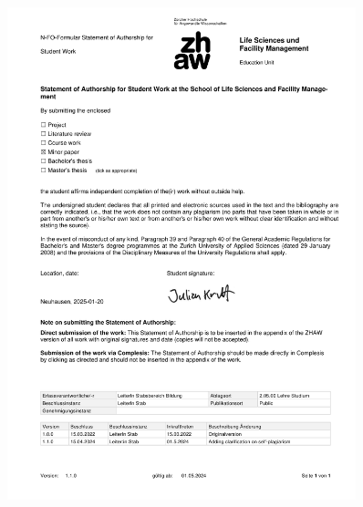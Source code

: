 \thispagestyle{empty}
\begin{figure}[h!]
    \centering
    \includegraphics[width=0.9\textwidth]{figures/denlaration_independence.pdf}
\end{figure}
\restoregeometry %

